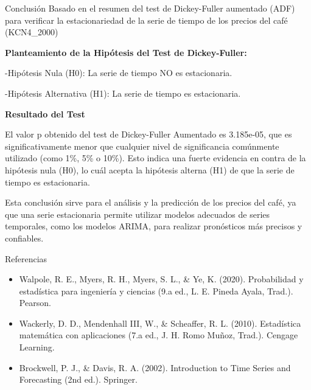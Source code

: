 \documentclass[
  10pt,
  ignorenonframetext,
  aspectratio=1612]{beamer}
\begin{document}
\begin{frame}{Conclusión}
\label{conclusiuxf3n}
Basado en el resumen del test de Dickey-Fuller aumentado (ADF) para
verificar la estacionariedad de la serie de tiempo de los precios del
café (KCN4\_2000)

\textbf{Planteamiento de la Hipótesis del Test de Dickey-Fuller:}

-Hipótesis Nula (H0): La serie de tiempo NO es estacionaria.

-Hipótesis Alternativa (H1): La serie de tiempo es estacionaria.

\textbf{Resultado del Test}

El valor p obtenido del test de Dickey-Fuller Aumentado es 3.185e-05,
que es significativamente menor que cualquier nivel de significancia
comúnmente utilizado (como 1\%, 5\% o 10\%). Esto indica una fuerte
evidencia en contra de la hipótesis nula (H0), lo cuál acepta la
hipótesis alterna (H1) de que la serie de tiempo es estacionaria.

Esta conclusión sirve para el análisis y la predicción de los precios
del café, ya que una serie estacionaria permite utilizar modelos
adecuados de series temporales, como los modelos ARIMA, para realizar
pronósticos más precisos y confiables.
\end{frame}

\begin{frame}{Referencias}
\label{referencias}
\begin{itemize}
\item
  Walpole, R. E., Myers, R. H., Myers, S. L., \& Ye, K. (2020).
  Probabilidad y estadística para ingeniería y ciencias (9.a ed., L. E.
  Pineda Ayala, Trad.). Pearson.
\item
  Wackerly, D. D., Mendenhall III, W., \& Scheaffer, R. L. (2010).
  Estadística matemática con aplicaciones (7.a ed., J. H. Romo Muñoz,
  Trad.). Cengage Learning.
\item
  Brockwell, P. J., \& Davis, R. A. (2002). Introduction to Time Series
  and Forecasting (2nd ed.). Springer.
\end{itemize}
\end{frame}
\end{document}
